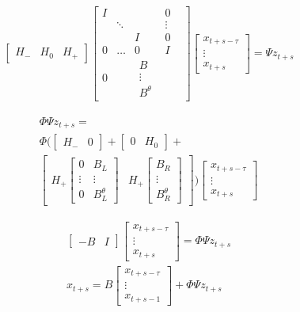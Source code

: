 \documentclass{article}
\begin{document}
{\begin{gather*}
  \begin{bmatrix}
    H_{-}&H_{0}&H_{+}
  \end{bmatrix}
  \begin{bmatrix}
    I&&&0\\&\ddots&&\vdots&\\&&I&0\\
0&\dots&0&I\\
0&&\begin{matrix}
      B\\\vdots\\B^\theta
    \end{matrix}
  \end{bmatrix}
  \begin{bmatrix}
    x_{t+s-\tau}\\\vdots\\x_{t+s}
  \end{bmatrix}= \Psi z_{t+s}
\end{gather*}

  \begin{multline*}
\Phi\Psi z_{t+s}=\\
\Phi  (\begin{bmatrix}
H_-&0
  \end{bmatrix} + 
  \begin{bmatrix}
    0&H_0
  \end{bmatrix} + \\
  \begin{bmatrix}
    H_+ \begin{bmatrix}
    0&B_L\\\vdots&\vdots\\0&B^\theta_L
  \end{bmatrix}& H_+\begin{bmatrix}
    B_R\\\vdots\\B^\theta_R
  \end{bmatrix}
  \end{bmatrix})  \begin{bmatrix}
    x_{t+s-\tau}\\\vdots\\x_{t+s}
  \end{bmatrix}
  \end{multline*}

  \begin{gather*}
  \begin{bmatrix}
    -B&I
  \end{bmatrix}
\begin{bmatrix}
    x_{t+s-\tau}\\\vdots\\x_{t+s}
  \end{bmatrix}= \Phi\Psi z_{t+s}\\
x_{t+s} = B \begin{bmatrix}
    x_{t+s-\tau}\\\vdots\\x_{t+s-1} 
  \end{bmatrix}+\Phi\Psi z_{t+s}
\end{gather*}


}
\end{document}

